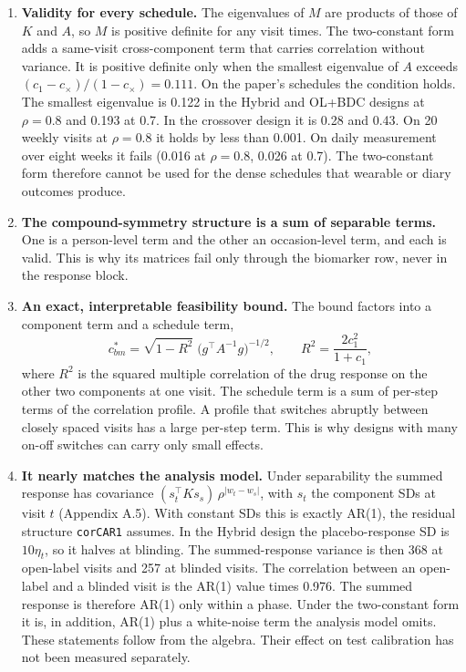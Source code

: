 \documentclass[
  11pt,
]{article}
\providecommand{\tightlist}{%
  \setlength{\itemsep}{0pt}\setlength{\parskip}{0pt}}
\begin{document}
\begin{enumerate}
\def\labelenumi{\arabic{enumi}.}
\tightlist
\item
  \textbf{Validity for every schedule.} The eigenvalues of \(M\) are products
  of those of \(K\) and \(A\), so \(M\) is positive definite for any visit
  times. The two-constant form adds a same-visit cross-component term
  that carries correlation without variance. It is positive definite
  only when the smallest eigenvalue of \(A\) exceeds
  \((c_1 - c_\times)/(1 - c_\times) = 0.111\). On the paper's schedules
  the condition holds. The smallest eigenvalue is 0.122 in the Hybrid
  and OL+BDC designs at \(\rho = 0.8\) and 0.193 at 0.7. In the
  crossover design it is 0.28 and 0.43. On 20 weekly visits at
  \(\rho = 0.8\) it holds by less than 0.001. On daily measurement
  over eight weeks it fails (0.016 at \(\rho = 0.8\), 0.026 at 0.7).
  The two-constant form therefore cannot be used for the dense
  schedules that wearable or diary outcomes produce.
\item
  \textbf{The compound-symmetry structure is a sum of separable terms.}
  One is a person-level term and the other an occasion-level term,
  and each is valid. This is why its matrices fail only
  through the biomarker row, never in the response block.
\item
  \textbf{An exact, interpretable feasibility bound.} The bound factors
  into a component term and a schedule term,
  \[c_{bm}^{*} = \sqrt{1 - R^2}\;\bigl(g^\top A^{-1} g\bigr)^{-1/2},
  \qquad R^2 = \frac{2c_1^2}{1 + c_1},\]
  where \(R^2\) is the squared multiple correlation of the drug response
  on the other two components at one visit. The schedule term is a
  sum of per-step terms of the correlation profile. A profile that
  switches abruptly between closely spaced visits has a large
  per-step term. This is why designs with many on-off switches can
  carry only small effects.
\item
  \textbf{It nearly matches the analysis model.} Under separability the
  summed response has covariance \((s_t^\top K s_s)\,\rho^{\lvert w_t
  - w_s\rvert}\), with \(s_t\) the component SDs at visit \(t\) (Appendix
  A.5). With constant SDs this is exactly AR(1), the residual
  structure \texttt{corCAR1} assumes. In the Hybrid design the
  placebo-response SD is \(10\eta_t\), so it halves at blinding. The
  summed-response variance is then 368 at open-label visits and 257
  at blinded visits. The correlation between an open-label and a
  blinded visit is the AR(1) value times 0.976. The summed response is
  therefore AR(1) only within a phase. Under the two-constant form it
  is, in addition, AR(1) plus a white-noise term the analysis model
  omits. These statements follow from the algebra. Their effect on
  test calibration has not been measured separately.
\end{enumerate}
\end{document}
